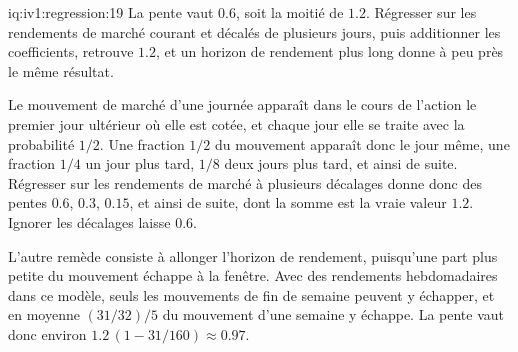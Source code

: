 \begin{solution}{iq:iv1:regression:19}
La pente vaut $0.6$, soit la moitié de $1.2$. Régresser sur les rendements de marché courant et décalés de plusieurs jours, puis additionner les coefficients, retrouve $1.2$, et un horizon de rendement plus long donne à peu près le même résultat.

Le mouvement de marché d'une journée apparaît dans le cours de l'action le premier jour ultérieur où elle est cotée, et chaque jour elle se traite avec la probabilité $1/2$. Une fraction $1/2$ du mouvement apparaît donc le jour même, une fraction $1/4$ un jour plus tard, $1/8$ deux jours plus tard, et ainsi de suite. Régresser sur les rendements de marché à plusieurs décalages donne donc des pentes $0.6$, $0.3$, $0.15$, et ainsi de suite, dont la somme est la vraie valeur $1.2$. Ignorer les décalages laisse $0.6$.

L'autre remède consiste à allonger l'horizon de rendement, puisqu'une part plus petite du mouvement échappe à la fenêtre. Avec des rendements hebdomadaires dans ce modèle, seuls les mouvements de fin de semaine peuvent y échapper, et en moyenne $(31/32)/5$ du mouvement d'une semaine y échappe. La pente vaut donc environ $1.2\,(1 - 31/160) \approx 0.97$.

\end{solution}

